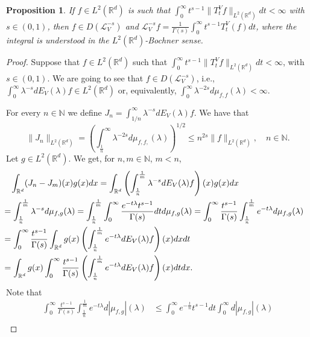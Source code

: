 \documentclass[10pt, a4paper, reqno]{amsart}
\newtheorem{prop}[thm]{Proposition}
\theoremstyle{definition}
\theoremstyle{remark}
\numberwithin{equation}{section}
\begin{document}
\begin{prop}\label{Ccreg} If $f\in L^2(\mathbb{R}^d)$ is  such that $\int_0^\infty t^{s-1}\|T_t^Vf\|_{L^2(\mathbb{R}^d)}dt<\infty$ with $s\in (0,1)$, then $f\in D(\mathcal{L}_V^{-s})$ and 
$\mathcal{L}_V^{-s}f=\frac{1}{\Gamma(s)}\int_0^\infty t^{s-1}T_t^V(f)dt$, where the integral is understood in the $L^2(\mathbb{R}^d)$-Bochner sense.
\end{prop}
\begin{proof} Suppose that $f\in L^2(\mathbb R^d)$ such that $\int_0^\infty t^{s -1}\|T_t^Vf\|_{L^2(\mathbb R^d)}dt<\infty$, with $s \in (0,1)$. We are going to see that $f\in D(\mathcal L_V^{-s})$, i.e., $\int_0^\infty \lambda^{-s}dE_V(\lambda)f\in L^2(\mathbb R^d)$ or, equivalently, $\int_0^\infty \lambda^{-2s}d\mu_{f,f}(\lambda)<\infty$.

For every $n\in \mathbb N$ we define $J_n=\int_{1/n}^\infty \lambda^{-s }dE_V(\lambda )f$. We have that
\[
\|J_n\|_{L^2(\mathbb R^d)}=\left(\int_{\frac{1}{n}}^\infty \lambda^{-2s }d\mu _{f,f,}(\lambda)\right)^{1/2}\leq n^{2s}\|f\|_{L^2(\mathbb R^d)},\quad n\in \mathbb N.
\]
Let $g\in L^2(\mathbb R^d)$. We get, for $n,m\in \mathbb N$, $m<n$, 
\begin{align}
\int_{\mathbb R^d}(J_n-J_m)(x)g(x)dx&=\int_{\mathbb R^d}\left(\int_{\frac{1}{n}}^{\frac{1}{m}}\lambda^{-s }dE_V(\lambda) f\right)(x)g(x)dx\nonumber\\
&\hspace{-4cm}=\int_{\frac{1}{n}}^{\frac{1}{m}}\lambda^{-s }d\mu_{f,g}(\lambda)=\int_{\frac{1}{n}}^{\frac{1}{m}}\int_0^\infty \frac{e^{-t\lambda}t^{s -1}}{\Gamma (s)}dtd\mu_{f,g}(\lambda)=\int_0^\infty \frac{t^{s -1}}{\Gamma (s)}\int_{\frac{1}{n}}^{\frac{1}{m}} e^{-t\lambda}d\mu_{f,g}(\lambda)\nonumber\\
&\hspace{-4cm}=\int_0^\infty \frac{t^{s -1}}{\Gamma (s)}\int_{\mathbb R^d}g(x)\left(\int_{\frac{1}{n}}^{\frac{1}{m}}e^{-t\lambda}dE_V(\lambda )f\right)(x)dxdt\label{(1)}\\
&\hspace{-4cm}=\int_{\mathbb R^d}g(x)\int_0^\infty \frac{t^{s -1}}{\Gamma (s)}\left(\int_{\frac{1}{n}}^{\frac{1}{m}}e^{-t\lambda}dE_V(\lambda )f\right)(x)dtdx.\label{(2)}
\end{align}
Note that
\begin{align*}
\int_0^\infty \frac{t^{s -1}}{\Gamma (s)}\int_{\frac{1}{n}}^{\frac{1}{m}} e^{-t\lambda}d|\mu_{f,g}|(\lambda)&\leq \int_0^\infty e^{-\frac{t}{n}}t^{s -1}dt\int_0^\infty d|\mu_{f,g}|(\lambda)\\

\end{align*}
\end{proof}
\end{document}
